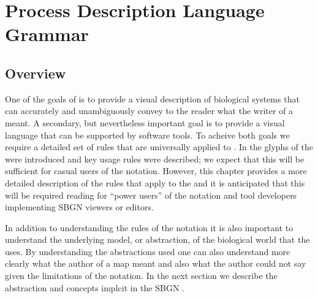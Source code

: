 \chapter{Process Description Language Grammar}
\label{chp:grammar}

\section{Overview}

One of the goals of \SBGNPDLone is to provide a visual description of biological systems that can accurately and unambiguously  convey to the reader what the writer of a \PDm meant. A secondary, but nevertheless important goal is to provide a visual language that can be supported by software tools. To acheive both goals we require a detailed set of rules that are universally applied to \PDms. In  the glyphs of the \PDl were introduced and key usage rules were described; we expect that this will be sufficient for casual users of the notation. However, this chapter provides a more detailed description of the rules that apply to the \PDl and it is anticipated that this will be required reading for ``power users'' of the notation and tool developers implementing SBGN \PD viewers or editors.

In addition to understanding the rules of the notation it is also important to understand the underlying model, or abstraction, of the biological world that the \PDl uses. By understanding the abstractions used one can also understand more clearly what the author of a map meant and also what the author could not say given the limitations of the notation. In the next section we describe the abstraction and concepts implcit in the SBGN \PDl.



